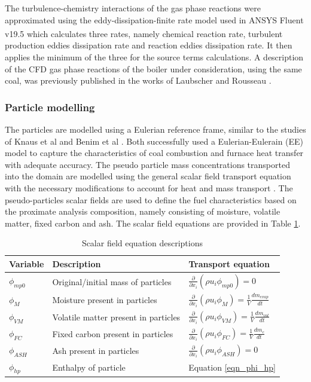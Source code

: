 \documentclass[twocolumn,10pt]{asme2ej}
\begin{document}
The turbulence-chemistry interactions of the gas phase reactions were approximated using the eddy-dissipation-finite rate model used in ANSYS Fluent v19.5\textsuperscript{\textregistered} which calculates three rates, namely chemical reaction rate, turbulent production eddies dissipation rate and reaction eddies dissipation rate. It then applies the minimum of the three for the source terms calculations. A description of the CFD gas phase reactions of the boiler under consideration, using the same coal, was previously published in the works of Laubscher and Rousseau \cite{Laubscher2019b}.

\subsubsection{Particle modelling}
The particles are modelled using a Eulerian reference frame, similar to the studies of Knaus et al \cite{Knaus2001a} and Benim et al \cite{Benim2005}. Both successfully used a Eulerian-Eulerain (EE) model to capture the characteristics of coal combustion and furnace heat transfer with adequate accuracy. The pseudo particle mass concentrations transported into the domain are modelled using the general scalar field transport equation with the necessary modifications to account for heat and mass transport \cite{Versteeg2007}. The pseudo-particles scalar fields are used to define the fuel characteristics based on the proximate analysis composition, namely consisting of moisture, volatile matter, fixed carbon and ash. The scalar field equations are provided in Table \ref{tab_scalars}.\\

\begin{table}[h!]
\centering
\caption{Scalar field equation descriptions}\label{tab_scalars}  
\vspace{2mm}     
\begin{tabularx}{3.25in}{p{0.4in} p{1.25in} l}
\hline
Variable &Description& Transport equation \\
\hline
$\phi_{mp0}$ &Original/initial mass of particles& $\frac{\partial}{\partial x_{i}}(\rho u_{i} \phi_{mp0})=0$\\
$\phi_{M}$&Moisture present in particles&$\frac{\partial}{\partial x_{i}}(\rho u_{i} \phi_{M})=\frac{1}{V} \frac{dm_{evap}}{dt}$\\
$\phi_{VM}$&Volatile matter present in particles&  $\frac{\partial}{\partial x_{i}}(\rho u_{i} \phi_{VM})=\frac{1}{V}\frac{dm_{vol}}{dt}$\\
$\phi_{FC}$&Fixed carbon present in particles&$\frac{\partial}{\partial x_{i}}(\rho u_{i} \phi_{FC})=\frac{1}{V}\frac{dm_c}{dt}$\\
$\phi_{ASH}$&Ash present in particles&$\frac{\partial}{\partial x_{i}}(\rho u_{i} \phi_{ASH})=0$\\
$\phi_{hp}$&Enthalpy of particle&Equation \eqref{eqn_phi_hp}\\
\hline
\end{tabularx}
\end{table}
\end{document}
